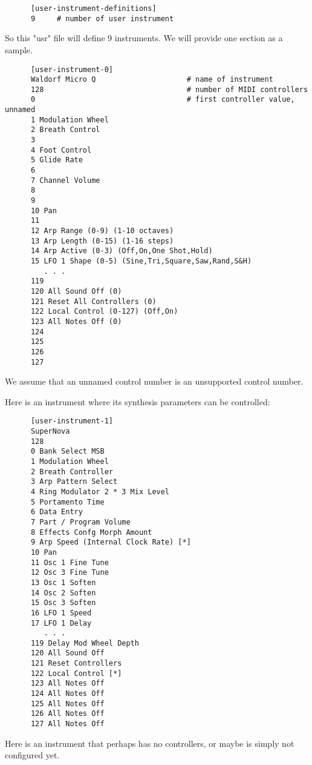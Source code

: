    \begin{verbatim}
      [user-instrument-definitions]
      9     # number of user instrument
   \end{verbatim}

   So this "usr" file will define 9 instruments.  We will provide one section
   as a sample.

   \begin{verbatim}
      [user-instrument-0]
      Waldorf Micro Q                     # name of instrument
      128                                 # number of MIDI controllers
      0                                   # first controller value, unnamed
      1 Modulation Wheel
      2 Breath Control
      3 
      4 Foot Control
      5 Glide Rate
      6 
      7 Channel Volume
      8
      9
      10 Pan
      11 
      12 Arp Range (0-9) (1-10 octaves)
      13 Arp Length (0-15) (1-16 steps)
      14 Arp Active (0-3) (Off,On,One Shot,Hold)
      15 LFO 1 Shape (0-5) (Sine,Tri,Square,Saw,Rand,S&H)
         . . .
      119
      120 All Sound Off (0)
      121 Reset All Controllers (0)
      122 Local Control (0-127) (Off,On)
      123 All Notes Off (0)
      124
      125
      126
      127
   \end{verbatim}

   We assume that an unnamed control number is an unsupported control number.

   Here is an instrument where its synthesis parameters can be controlled:

   \begin{verbatim}
      [user-instrument-1]
      SuperNova
      128
      0 Bank Select MSB
      1 Modulation Wheel
      2 Breath Controller
      3 Arp Pattern Select
      4 Ring Modulator 2 * 3 Mix Level
      5 Portamento Time
      6 Data Entry
      7 Part / Program Volume
      8 Effects Confg Morph Amount
      9 Arp Speed (Internal Clock Rate) [*]
      10 Pan
      11 Osc 1 Fine Tune
      12 Osc 3 Fine Tune
      13 Osc 1 Soften
      14 Osc 2 Soften
      15 Osc 3 Soften
      16 LFO 1 Speed
      17 LFO 1 Delay
         . . .
      119 Delay Mod Wheel Depth
      120 All Sound Off
      121 Reset Controllers
      122 Local Control [*]
      123 All Notes Off
      124 All Notes Off
      125 All Notes Off
      126 All Notes Off
      127 All Notes Off
   \end{verbatim}

   Here is an instrument that perhaps has no controllers, or maybe is simply
   not configured yet.

